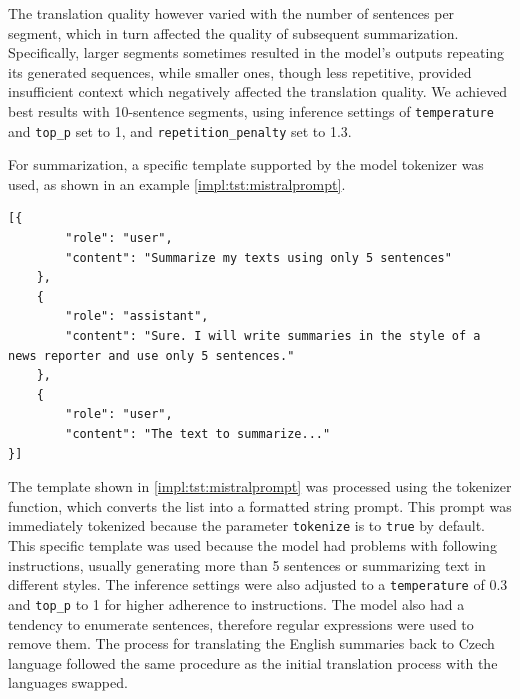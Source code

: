 \documentclass[english, ba, kiv, he, iso690numb, pdf, viewonly]{fasthesis}
\begin{document}
The translation quality however varied with the number of sentences per segment, which in turn affected the quality of subsequent summarization. Specifically, larger segments sometimes resulted in the model's outputs repeating its generated sequences, while smaller ones, though less repetitive, provided insufficient context which negatively affected the translation quality. We achieved best results with 10-sentence segments, using inference settings of \texttt{temperature} and \texttt{top\_p} set to 1, and \texttt{repetition\_penalty} set to 1.3.

For summarization, a specific template supported by the model tokenizer was used, as shown in an example \ref{impl:tst:mistralprompt}.

\lstset{style=FASThesisLstStyle,} %
\begin{lstlisting}[caption={Summarization template for TST\label{impl:tst:mistralprompt}}] 
[{
        "role": "user",
        "content": "Summarize my texts using only 5 sentences"
    },
    {
        "role": "assistant",
        "content": "Sure. I will write summaries in the style of a news reporter and use only 5 sentences."
    },
    {
        "role": "user",
        "content": "The text to summarize..."
}]    
\end{lstlisting}
The template shown in \ref{impl:tst:mistralprompt} was processed using the tokenizer  function, which converts the list into a formatted string prompt. This prompt was immediately tokenized because the parameter \texttt{tokenize} is to \texttt{true} by default. This specific template was used because the model had problems with following instructions, usually generating more than 5 sentences or summarizing text in different styles. The inference settings were also adjusted to a \texttt{temperature} of 0.3 and \texttt{top\_p} to 1 for higher adherence to instructions. The model also had a tendency to enumerate sentences, therefore regular expressions were used to remove them. The process for translating the English summaries back to Czech language followed the same procedure as the initial translation process with the languages swapped.
\end{document}
